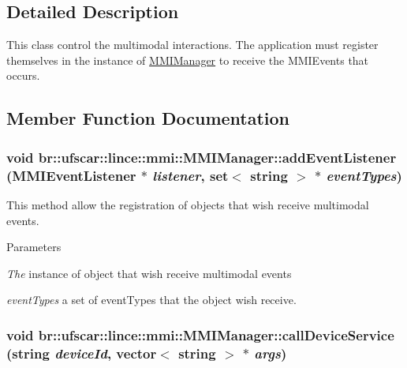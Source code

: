 \subsection{Detailed Description}
This class control the multimodal interactions. The application must register themselves in the instance of \hyperlink{classbr_1_1ufscar_1_1lince_1_1mmi_1_1MMIManager}{MMIManager} to receive the MMIEvents that occurs. 

\subsection{Member Function Documentation}
\hypertarget{classbr_1_1ufscar_1_1lince_1_1mmi_1_1MMIManager_a6cd07df71e304c7257c91ce145ada8f5}{
\subsubsection[{addEventListener}]{\setlength{\rightskip}{0pt plus 5cm}void br::ufscar::lince::mmi::MMIManager::addEventListener ({\bf MMIEventListener} $\ast$ {\em listener}, \/  set$<$ string $>$ $\ast$ {\em eventTypes})}}
\label{classbr_1_1ufscar_1_1lince_1_1mmi_1_1MMIManager_a6cd07df71e304c7257c91ce145ada8f5}


This method allow the registration of objects that wish receive multimodal events. 


\begin{DoxyParams}{Parameters}
\item[{\em The}]instance of object that wish receive multimodal events \item[{\em eventTypes}]a set of eventTypes that the object wish receive. \end{DoxyParams}
\hypertarget{classbr_1_1ufscar_1_1lince_1_1mmi_1_1MMIManager_afaf755202a19c63ec903ff1d70362126}{
\subsubsection[{callDeviceService}]{\setlength{\rightskip}{0pt plus 5cm}void br::ufscar::lince::mmi::MMIManager::callDeviceService (string {\em deviceId}, \/  vector$<$ string $>$ $\ast$ {\em args})}}
\label{classbr_1_1ufscar_1_1lince_1_1mmi_1_1MMIManager_afaf755202a19c63ec903ff1d70362126}


